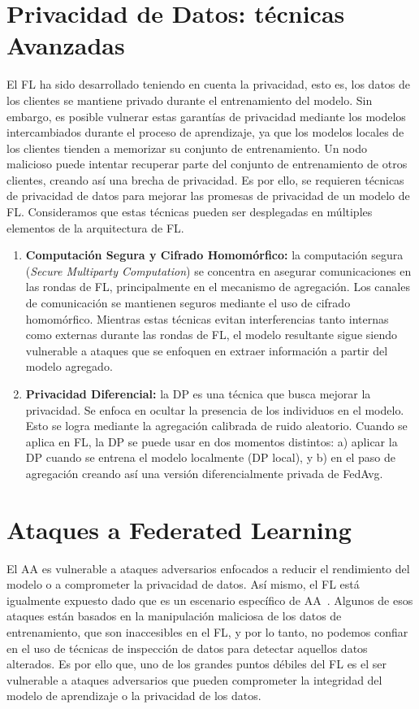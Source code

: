 \begin{itemize}
    \section{Privacidad de Datos: técnicas Avanzadas}
    El \ac{FL} ha sido desarrollado teniendo en cuenta la privacidad, esto es, los datos de los clientes se mantiene privado durante el entrenamiento del modelo. Sin embargo, es posible vulnerar estas garantías de privacidad mediante los modelos intercambiados durante el proceso de aprendizaje, ya que los modelos locales de los clientes tienden a memorizar su conjunto de entrenamiento. Un nodo malicioso puede intentar recuperar parte del conjunto de entrenamiento de otros clientes, creando así una brecha de privacidad. Es por ello, se requieren técnicas de privacidad de datos para mejorar las promesas de privacidad de un modelo de \ac{FL}. Consideramos que estas técnicas pueden ser desplegadas en múltiples elementos de la arquitectura de \ac{FL}.
    \begin{enumerate}
        \item \textbf{Computación Segura y Cifrado Homomórfico:} la  computación segura (\textit{Secure Multiparty Computation}) se concentra en asegurar comunicaciones en las rondas de \ac{FL}, principalmente en el mecanismo de agregación. Los canales de comunicación se mantienen seguros mediante el uso de cifrado homomórfico. Mientras estas técnicas evitan interferencias tanto internas como externas durante las rondas de \ac{FL}, el modelo resultante sigue siendo vulnerable a ataques que se enfoquen en extraer información a partir del modelo agregado.
        \item \textbf{Privacidad Diferencial:} la \ac{DP} es una técnica que busca mejorar la privacidad. Se enfoca en ocultar la presencia de los individuos en el modelo. Esto se logra mediante la agregación calibrada de ruido aleatorio. Cuando se aplica en \ac{FL}, la \ac{DP} se puede usar en dos momentos distintos: a) aplicar la \ac{DP} cuando se entrena el modelo localmente (\ac{DP} local), y b) en el paso de agregación creando así una versión diferencialmente privada de \ac{FedAvg}.
    \end{enumerate}

    \section{Ataques a Federated Learning}\label{sec:ataquesfl}
    El \ac{AA} es vulnerable a ataques adversarios enfocados a reducir el rendimiento del modelo o a comprometer la privacidad de datos. Así mismo, el \ac{FL} está igualmente expuesto dado que es un escenario específico de \ac{AA}~\cite{survey-nuria-2023}. Algunos de esos ataques están basados en la manipulación maliciosa de los datos de entrenamiento, que son inaccesibles en el \ac{FL}, y por lo tanto, no podemos confiar en el uso de técnicas de inspección de datos para detectar aquellos datos alterados. Es por ello que, uno de los grandes puntos débiles del \ac{FL} es el ser vulnerable a ataques adversarios que pueden comprometer la integridad del modelo de aprendizaje o la privacidad de los datos.


\end{itemize}
